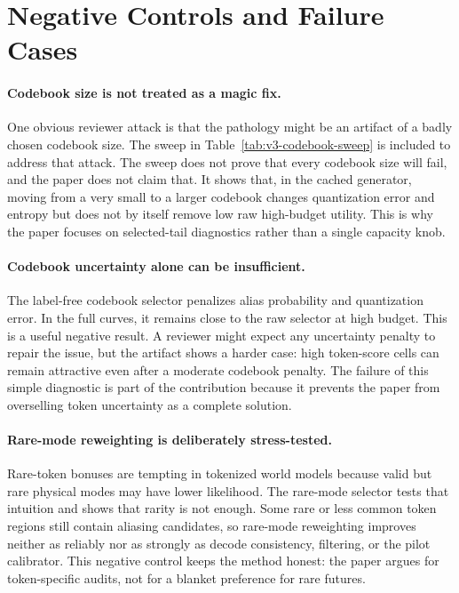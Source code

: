 \section{Negative Controls and Failure Cases}
\label{app:negative-controls}

\paragraph{Codebook size is not treated as a magic fix.}
One obvious reviewer attack is that the pathology might be an artifact of a badly chosen codebook size. The sweep in Table~\ref{tab:v3-codebook-sweep} is included to address that attack. The sweep does not prove that every codebook size will fail, and the paper does not claim that. It shows that, in the cached generator, moving from a very small to a larger codebook changes quantization error and entropy but does not by itself remove low raw high-budget utility. This is why the paper focuses on selected-tail diagnostics rather than a single capacity knob.

\paragraph{Codebook uncertainty alone can be insufficient.}
The label-free codebook selector penalizes alias probability and quantization error. In the full curves, it remains close to the raw selector at high budget. This is a useful negative result. A reviewer might expect any uncertainty penalty to repair the issue, but the artifact shows a harder case: high token-score cells can remain attractive even after a moderate codebook penalty. The failure of this simple diagnostic is part of the contribution because it prevents the paper from overselling token uncertainty as a complete solution.

\paragraph{Rare-mode reweighting is deliberately stress-tested.}
Rare-token bonuses are tempting in tokenized world models because valid but rare physical modes may have lower likelihood. The rare-mode selector tests that intuition and shows that rarity is not enough. Some rare or less common token regions still contain aliasing candidates, so rare-mode reweighting improves neither as reliably nor as strongly as decode consistency, filtering, or the pilot calibrator. This negative control keeps the method honest: the paper argues for token-specific audits, not for a blanket preference for rare futures.


